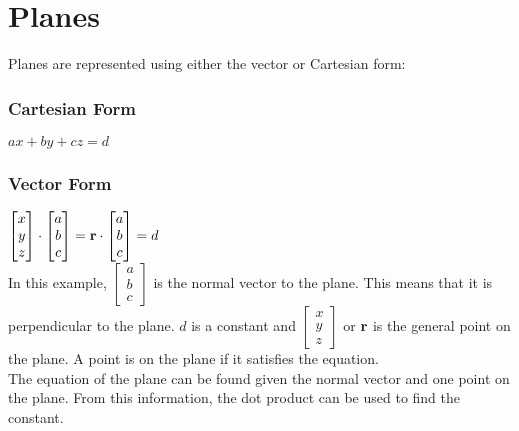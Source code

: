 \documentclass[class=article, crop=false]{standalone}
\begin{document}
\section*{Planes}
Planes are represented using either the vector or Cartesian form: \\
\subsubsection*{Cartesian Form}
$ax + by + cz = d$
\subsubsection*{Vector Form}
$\begin{bmatrix} x \\ y \\ z \end{bmatrix} \cdot 
\begin{bmatrix} a \\ b \\ c \end{bmatrix} = 
\bold{r} \cdot 
\begin{bmatrix} a \\ b \\ c \end{bmatrix} =  d$ \\

In this example, $\begin{bmatrix} a \\ b \\ c \end{bmatrix}$ is the normal vector to the plane. This means that it is perpendicular to the plane. $d$ is a constant and $\begin{bmatrix} x \\ y \\ z \end{bmatrix}$ or $\bold{r}$ is the general point on the plane. A point is on the plane if it satisfies the equation. \\

The equation of the plane can be found given the normal vector and one point on the plane. From this information, the dot product can be used to find the constant. 
\end{document}
